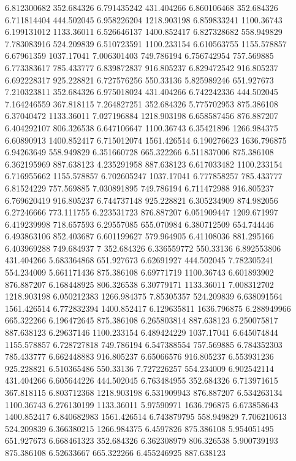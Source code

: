 6.812300682	352.684326
6.791435242	431.404266
6.860106468	352.684326
6.711814404	444.502045
6.958226204	1218.903198
6.859833241	1100.36743
6.199131012	1133.36011
6.526646137	1400.852417
6.827328682	558.949829
7.783083916	524.209839
6.510723591	1100.233154
6.610563755	1155.578857
6.67961359	1037.17041
7.006301403	749.786194
6.756742954	757.569885
6.773383617	785.433777
6.839872837	916.805237
6.829472542	916.805237
6.692228317	925.228821
6.727576256	550.33136
5.825989246	651.927673
7.210323811	352.684326
6.975018024	431.404266
6.742242336	444.502045
7.164246559	367.818115
7.264827251	352.684326
5.775702953	875.386108
6.37040472	1133.36011
7.027196884	1218.903198
6.658587456	876.887207
6.404292107	806.326538
6.647106647	1100.36743
6.35421896	1266.984375
6.60890913	1400.852417
6.715012074	1561.426514
6.190276623	1636.796875
6.94263649	558.949829
6.351660728	665.322266
6.511837006	875.386108
6.362195969	887.638123
4.235291958	887.638123
6.617033482	1100.233154
6.716955662	1155.578857
6.702605247	1037.17041
6.777858257	785.433777
6.81524229	757.569885
7.030891895	749.786194
6.711472988	916.805237
6.769620419	916.805237
6.744737148	925.228821
6.305234909	874.982056
6.27246666	773.111755
6.223531723	876.887207
6.051909447	1209.671997
6.419239998	718.657593
6.29557085	655.070984
6.380712509	654.744446
6.493863106	852.403687
6.601199627	579.964905
6.41108036	881.295166
6.403969288	749.684937
7	352.684326
6.336559772	550.33136
6.892553806	431.404266
5.683364868	651.927673
6.62691927	444.502045
7.782305241	554.234009
5.661171436	875.386108
6.69771719	1100.36743
6.601893902	876.887207
6.168448925	806.326538
6.30779171	1133.36011
7.008312702	1218.903198
6.050212383	1266.984375
7.85305357	524.209839
6.638091564	1561.426514
6.772832394	1400.852417
6.129635811	1636.796875
6.288949966	665.322266
6.196472645	875.386108
6.265803814	887.638123
6.250075817	887.638123
6.29637146	1100.233154
6.489424229	1037.17041
6.645074844	1155.578857
6.728727818	749.786194
6.547388554	757.569885
6.784352303	785.433777
6.662448883	916.805237
6.65066576	916.805237
6.553931236	925.228821
6.510365486	550.33136
7.727226257	554.234009
6.902542114	431.404266
6.605644226	444.502045
6.763484955	352.684326
6.713971615	367.818115
6.803712368	1218.903198
6.531909943	876.887207
6.534263134	1100.36743
6.276130199	1133.36011
5.97590971	1636.796875
6.673858643	1400.852417
6.840682983	1561.426514
6.743879795	558.949829
7.706210613	524.209839
6.366380215	1266.984375
6.4597826	875.386108
5.954051495	651.927673
6.668461323	352.684326
6.362308979	806.326538
5.900739193	875.386108
6.52633667	665.322266
6.455246925	887.638123
